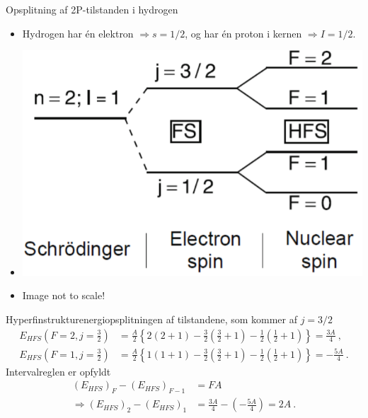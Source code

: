 %
Opsplitning af 2P-tilstanden i hydrogen
\begin{itemize}
    \item Hydrogen har én elektron $\Rightarrow s = 1/2$, og har én proton i kernen $\Rightarrow I = 1/2$.
    \item \includegraphics[width=.65\textwidth]{Q16/images/HyperFineSplittingOf2PstateInHydrogen.PNG}
    \item Image not to scale!
\end{itemize}
Hyperfinstrukturenergiopsplitningen af tilstandene, som kommer af $j=3/2$
\begin{align*}
    E_{HFS}\left(F=2,j=\frac{3}{2}\right) &= \frac{A}{2} \left\{2(2+1) - \frac{3}{2}\left(\frac{3}{2}+1\right) - \frac{1}{2}\left(\frac{1}{2}+1\right)\right\} = \frac{3A}{4} \: , \\
    E_{HFS}\left(F=1,j=\frac{3}{2}\right) &= \frac{A}{2} \left\{1(1+1) - \frac{3}{2}\left(\frac{3}{2}+1\right) - \frac{1}{2}\left(\frac{1}{2}+1\right)\right\} = -\frac{5A}{4} \: .
\end{align*}
Intervalreglen er opfyldt
\begin{align*}
    (E_{HFS})_F - (E_{HFS})_{F-1} &= FA \\
    \Rightarrow (E_{HFS})_2 - (E_{HFS})_1 &= \frac{3A}{4} - \left(-\frac{5A}{4}\right) = 2A \: .
\end{align*}
\normalsize